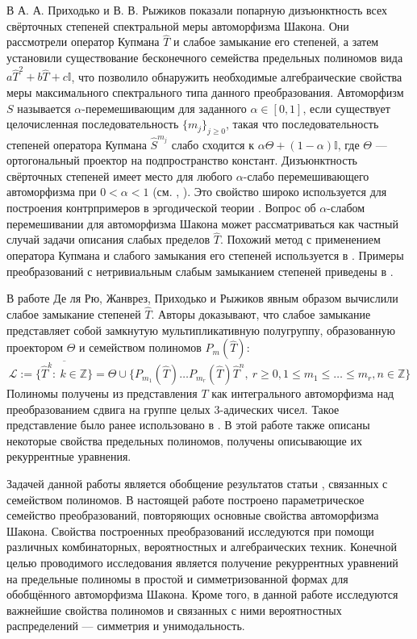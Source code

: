 \documentclass[14pt, a4paper, russian]{report}
\begin{document}
В \cite{convolutions} А. А. Приходько и В. В. Рыжиков показали попарную дизъюнктность всех свёрточных степеней спектральной меры автоморфизма Шакона. Они рассмотрели оператор Купмана $\hat{T}$ и слабое замыкание его степеней, а затем установили существование бесконечного семейства предельных полиномов вида $a\hat{T}^2 + b\hat{T} + c\mathbb{I}$, что позволило обнаружить необходимые алгебраические свойства меры максимального спектрального типа данного преобразования.
Автоморфизм $S$ называется $\alpha$-перемешивающим для заданного $\alpha \in [0,1]$, если существует целочисленная последовательность $\{m_j\}_{j \ge 0}$, такая что последовательность степеней оператора Купмана $\hat{S}^{m_j}$ слабо сходится к $\alpha \Theta + (1-\alpha) \mathbb{I}$, где $\Theta$ --- ортогональный проектор на подпространство констант. 
Дизъюнктность свёрточных степеней имеет место для любого $\alpha$-слабо перемешивающего автоморфизма при $0 < \alpha < 1$ (см. \cite{katok}, \cite{stepin}). Это свойство широко используется для построения контрпримеров в эргодической теории \cite{deljunco1992}. Вопрос об $\alpha$-слабом перемешивании для автоморфизма Шакона может рассматриваться как частный случай задачи описания слабых пределов $\hat{T}$. Похожий метод с применением оператора Купмана и слабого замыкания его степеней используется в \cite{delarue2012}. Примеры преобразований с нетривиальным слабым замыканием степеней приведены в \cite{ryzhikov}.

В работе \cite{weaklimits} Де ля Рю, Жанврез, Приходько и Рыжиков явным образом вычислили слабое замыкание степеней $\hat{T}$. Авторы доказывают, что слабое замыкание представляет собой замкнутую мультипликативную полугруппу, образованную проектором $\Theta$ и семейством полиномов $P_m(\hat{T})$:
$$\mathcal{L} := \overline{\{\hat{T}^k:\ k \in \mathbb{Z}\}} = \Theta \cup \{P_{m_1}(\hat{T}) \ldots P_{m_r}(\hat{T})\hat{T}^n,\ r \ge 0, 1 \le m_1 \le \ldots \le m_r, n \in \mathbb{Z}\}$$
Полиномы получены из представления $T$ как интегрального автоморфизма над преобразованием сдвига на группе целых $3$-адических чисел. Такое представление было ранее использовано в \cite{convolutions}. В этой работе также описаны некоторые свойства предельных полиномов, получены описывающие их рекуррентные уравнения.

Задачей данной работы является обобщение результатов статьи \cite{weaklimits}, связанных с семейством полиномов. В настоящей работе построено параметрическое семейство преобразований, повторяющих основные свойства автоморфизма Шакона. Свойства построенных преобразований исследуются при помощи различных комбинаторных, вероятностных и алгебраических техник. Конечной целью проводимого исследования является получение рекуррентных уравнений на предельные полиномы в простой и симметризованной формах для обобщённого автоморфизма Шакона. Кроме того, в данной работе исследуются важнейшие свойства полиномов и связанных с ними вероятностных распределений --- симметрия и унимодальность.
\end{document}
